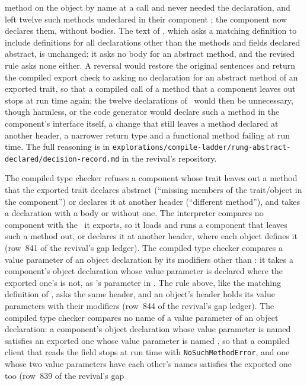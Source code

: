 \begin{description}
method on the object by name at a call and never needed the declaration, and
left twelve such methods undeclared in their component
; the component now declares them, without bodies.
The text of , which asks a matching definition to include
definitions for all declarations other than the methods and fields declared
abstract, is unchanged: it asks no body for an abstract method, and the revised
rule asks none either.
A reversal would restore the original sentences and return the compiled
export check to asking no declaration for an abstract method of an exported
trait, so that a compiled call of a method that a component leaves out stops
at run time again; the twelve declarations of \library\ would then be
unnecessary, though harmless, or the code generator would declare such a
method in the component's interface itself, a change that still leaves a
method declared at another header, a narrower return type and a functional
method failing at run time.
The full reasoning is in
\nolinkurl{explorations/compile-ladder/rung-abstract-declared/decision-record.md}
in the revival's repository.
\item[Effect] The compiled type checker refuses a component whose trait leaves
out a method that the exported trait declares abstract (``missing members of
the trait/object in the component'') or declares it at another header
(``different method''), and takes a declaration with a body or without one.
The interpreter compares no component with the \apisN\ it exports, so it loads
and runs a component that leaves such a method out, or declares it at another
header, where each object defines it (row~841 of the revival's gap
ledger).
The compiled type checker compares a value parameter of an object
declaration by its modifiers other than : it takes a component's
object declaration whose value parameter is declared  where the
exported one's is not, as 's parameter  in
.
The rule above, like the matching definition of , asks the same
header, and an object's header holds its value parameters with their
modifiers (row~844 of the revival's gap ledger).
The compiled type checker compares no name of a value parameter of an object
declaration: a component's object declaration whose value parameter is named
 satisfies an exported one whose value parameter is named , so
that a compiled client that reads the field  stops at run time with
\texttt{NoSuchMethodError}, and one whose two value parameters have each
other's names satisfies the exported one too (row~839 of the revival's gap

\end{description}
